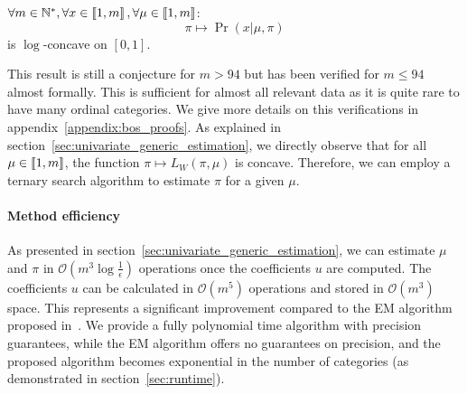 \begin{conjecture}
    $\forall m \in \mathbb{N}^*, \forall x \in \left\llbracket1, m\right\rrbracket, \forall \mu \in \left\llbracket1, m\right\rrbracket$:
    \[\pi \mapsto \Pr(x | \mu, \pi) \] 
    is $\log$-concave on $[0, 1]$.
\end{conjecture}

This result is still a conjecture for $m > 94$ but has been verified for $m \leq 94$ almost formally. This is sufficient for almost all relevant data as it is quite rare to have many ordinal categories. We give more details on this verifications in appendix~\ref{appendix:bos_proofs}.
As explained in section~\ref{sec:univariate_generic_estimation}, we directly observe that for all $\mu \in \left\llbracket1, m\right\rrbracket$, the function $\pi \mapsto L_W(\pi, \mu)$ is concave. Therefore, we can employ a ternary search algorithm to estimate $\pi$ for a given $\mu$.

\paragraph{Method efficiency}

As presented in section~\ref{sec:univariate_generic_estimation}, we can estimate $\mu$ and $\pi$ in $\mathcal O(m^3 \log \frac{1}{\epsilon})$ operations once the coefficients $u$ are computed. The coefficients $u$ can be calculated in $\mathcal O(m^5)$ operations and stored in $\mathcal O(m^3)$ space. This represents a significant improvement compared to the EM algorithm proposed in~\cite{biernacki2016model}. We provide a fully polynomial time algorithm with precision guarantees, while the EM algorithm offers no guarantees on precision, and the proposed algorithm becomes exponential in the number of categories (as demonstrated in section~\ref{sec:runtime}).




